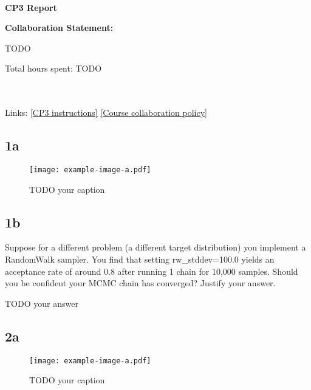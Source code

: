 \documentclass[10pt]{article}
\newcommand{\officialdirections}[1]{{\color{purple} #1}}
\begin{document}
~~\\ %

{\Large{\bf CP3 Report }}

\Large{\bf Collaboration Statement:}

TODO

Total hours spent: TODO

~~\\
~~\\
Links: 
\href{https://www.cs.tufts.edu/cs/136/2024s/cp3.html}{[CP3 instructions]} 
\href{https://www.cs.tufts.edu/cs/136/2024s/index.html#collaboration}{[Course collaboration policy]} 

\setcounter{tocdepth}{2}
\tableofcontents

\newpage

\subsection{1a}

\renewcommand{\figurename}{Fig.}
\renewcommand{\thefigure}{1a}
 \begin{figure}[!h]
     \centering
     \texttt{[image: example-image-a.pdf]}
     \label{fig:1a}
\caption{
TODO your caption
}%
 \end{figure}

\subsection{1b}
\officialdirections{
    Suppose for a different problem (a different target distribution) you implement a RandomWalk sampler.
    You find that setting rw\_stddev=100.0 yields an acceptance rate of around 0.8 after running 1 chain for 10,000 samples. Should you be confident your MCMC chain has converged? Justify your answer.}

TODO your answer

\newpage

\subsection{2a}

\renewcommand{\figurename}{Fig.}
\renewcommand{\thefigure}{2a}
\begin{figure}[!h]
     \centering
     \texttt{[image: example-image-a.pdf]}
     \label{fig:2a}
\caption{
TODO your caption
}%
 \end{figure}
 
\end{document}
